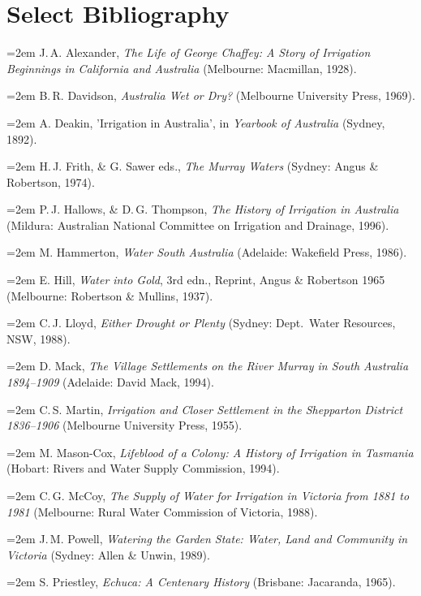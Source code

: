 %

\def\refitem{\medskip\noindent\hangindent=2em}

\chapter{Select Bibliography}

\refitem
J.\,A. Alexander, {\em The Life of {George} {Chaffey}: A Story of Irrigation
  Beginnings in {California} and {Australia}\/} (Melbourne: Macmillan, 1928).

\refitem
B.\,R. Davidson, {\em Australia Wet or Dry?\/} (Melbourne University Press,
  1969).

\refitem
A. Deakin, 'Irrigation in {Australia}', in {\em Yearbook of Australia\/}
  (Sydney, 1892).

\refitem
H.\,J. Frith, \& G. Sawer eds., {\em {The} {Murray} Waters\/}
  (Sydney: Angus \& Robertson, 1974).

\refitem
P.\,J. Hallows, \& D.\,G. Thompson, {\em The History of Irrigation in
  {Australia}\/} (Mildura: Australian National Committee on Irrigation
  and Drainage, 1996).

\refitem
M. Hammerton, {\em Water {South} {Australia}\/} (Adelaide: Wakefield
Press, 1986).

\refitem
E. Hill, {\em Water into Gold\/}, 3rd edn., Reprint, Angus \&
  Robertson 1965 (Melbourne: Robertson \& Mullins, 1937).

\refitem
C.\,J. Lloyd, {\em Either Drought or Plenty\/} (Sydney: Dept.\ Water
  Resources, NSW, 1988).

\refitem
D. Mack, {\em The Village Settlements on the {River} {Murray} in
  {South} {Australia} 1894--1909\/} (Adelaide: David Mack, 1994).

\refitem
C.\,S. Martin, {\em Irrigation and Closer Settlement in the {Shepparton}
  District 1836--1906\/} (Melbourne University Press, 1955).

\refitem
M. Mason-Cox, {\em Lifeblood of a Colony: A History of Irrigation in
  {Tasmania}\/} (Hobart: Rivers and Water Supply Commission, 1994).

\refitem
C.\,G. McCoy, {\em The Supply of Water for Irrigation in {Victoria}
  from 1881 to 1981\/} (Melbourne: Rural Water Commission of Victoria,
  1988).

\refitem
J.\,M. Powell, {\em Watering the Garden State: Water, Land and
  Community in {Victoria}\/} (Sydney: Allen \& Unwin, 1989).

\refitem
S. Priestley, {\em Echuca: A Centenary History\/} (Brisbane:
Jacaranda, 1965).

